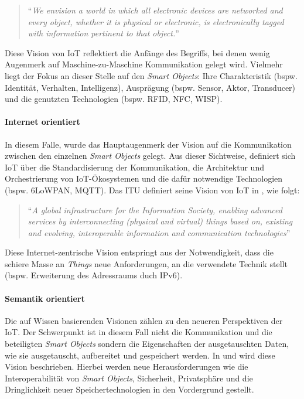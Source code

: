 \begin{quote}
    "`\textit{We envision a world in which all electronic devices are networked and every object, whether it is physical or electronic, is electronically tagged with information pertinent to that object.}"'
\end{quote}

Diese Vision von \ac{IoT} reflektiert die Anfänge des Begriffs, bei denen wenig Augenmerk auf Maschine-zu-Maschine Kommunikation gelegt wird. Vielmehr liegt der Fokus an dieser Stelle auf den \textit{Smart Objects}: Ihre Charakteristik (bspw. Identität, Verhalten, Intelligenz), Ausprägung (bspw. Sensor, Aktor, Transducer) und die genutzten Technologien (bspw. RFID, NFC, WISP).

\paragraph{Internet orientiert} In diesem Falle, wurde das Hauptaugenmerk der Vision auf die Kommunikation zwischen den einzelnen \textit{Smart Objects} gelegt. Aus dieser Sichtweise, definiert sich \ac{IoT} über die Standardisierung der Kommunikation, die Architektur und Orchestrierung von \ac{IoT}-Ökosystemen und die dafür notwendige Technologien (bspw. 6LoWPAN, MQTT). Das \ac{ITU} definiert seine Vision von \ac{IoT} in \cite{itut2012}, wie folgt: 

\begin{quote}
"`\textit{A global infrastructure for the Information Society, enabling advanced services by interconnecting (physical and virtual) things based on, existing and evolving, interoperable information and communication technologies}"'
\end{quote}

Diese Internet-zentrische Vision entspringt aus der Notwendigkeit, dass die schiere Masse an \textit{Things} neue Anforderungen, an die verwendete Technik stellt (bspw. Erweiterung des Adressraums duch IPv6). 

\paragraph{Semantik orientiert} Die auf Wissen basierenden Visionen zählen zu den neueren Perspektiven der \ac{IoT}. Der Schwerpunkt ist in diesem Fall nicht die Kommunikation und die beteiligten \textit{Smart Objects} sondern die Eigenschaften der ausgetauschten Daten, wie sie ausgetauscht, aufbereitet und gespeichert werden. In \cite{Kotis2012} und \cite{Singh2014} wird diese Vision beschrieben. Hierbei werden neue Herausforderungen wie die Interoperabilität von \textit{Smart Objects}, Sicherheit, Privatsphäre \cite{weber2010internet} und die Dringlichkeit neuer Speichertechnologien in den Vordergrund gestellt.

